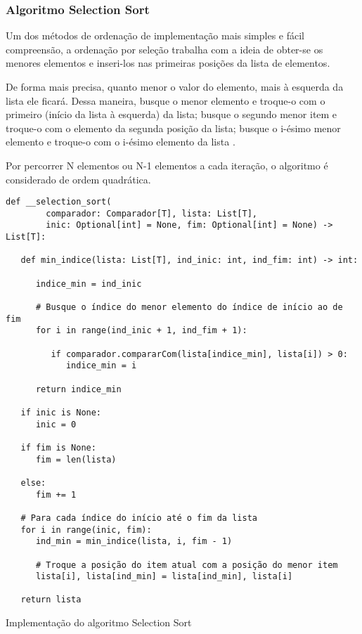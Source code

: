 \documentclass[a4paper,12pt]{scrartcl}
\begin{document}
\subsubsection{Algoritmo Selection Sort}
Um dos métodos de ordenação de implementação mais simples e fácil compreensão, a ordenação por seleção trabalha com a ideia de obter-se os menores elementos e inseri-los nas primeiras posições da lista de elementos.

De forma mais precisa, quanto menor o valor do elemento, mais à esquerda da lista ele ficará. Dessa maneira, busque o menor elemento e troque-o com o primeiro (início da lista à esquerda) da lista; busque o segundo menor item e troque-o com o elemento da segunda posição da lista; busque o i-ésimo menor elemento e troque-o com o i-ésimo elemento da lista \cite{knuth}.

Por percorrer N elementos ou N-1 elementos a cada iteração, o algoritmo é considerado de ordem quadrática.
\begin{listing}[H]
\begin{verbatim}
def __selection_sort(
        comparador: Comparador[T], lista: List[T],
        inic: Optional[int] = None, fim: Optional[int] = None) -> List[T]:

   def min_indice(lista: List[T], ind_inic: int, ind_fim: int) -> int:

      indice_min = ind_inic

      # Busque o índice do menor elemento do índice de início ao de fim
      for i in range(ind_inic + 1, ind_fim + 1):

         if comparador.compararCom(lista[indice_min], lista[i]) > 0:
            indice_min = i

      return indice_min

   if inic is None:
      inic = 0

   if fim is None:
      fim = len(lista)

   else:
      fim += 1

   # Para cada índice do início até o fim da lista
   for i in range(inic, fim):
      ind_min = min_indice(lista, i, fim - 1)

      # Troque a posição do item atual com a posição do menor item
      lista[i], lista[ind_min] = lista[ind_min], lista[i]

   return lista
\end{verbatim}
\caption{\footnotesize{Implementação do algoritmo Selection Sort}}
\end{listing}
\end{document}
